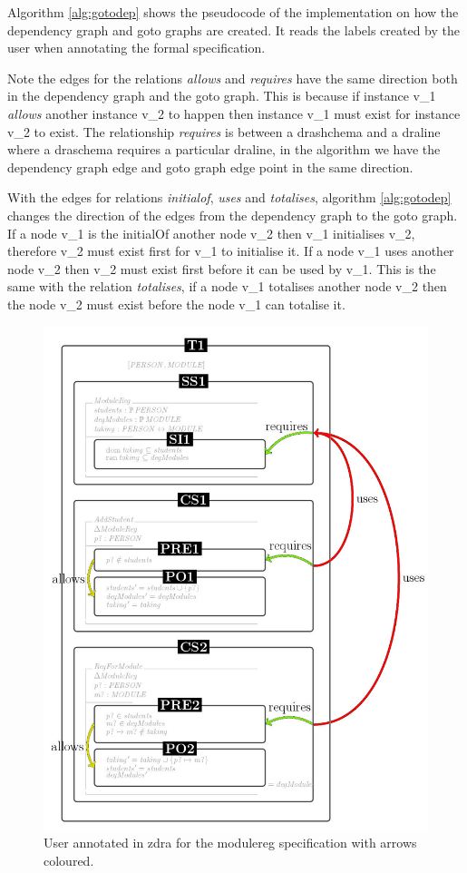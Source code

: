 Algorithm \ref{alg:gotodep} shows the pseudocode of the implementation on how the dependency graph and goto graphs are created. It reads the labels created by the user when annotating the formal specification. 

Note the edges for the relations \emph{allows} and \emph{requires} have the same direction both in the dependency graph and the goto graph. This is because if instance v\_1 \emph{allows} another instance v\_2 to happen then instance v\_1 must exist for instance v\_2 to exist. The relationship \emph{requires} is between a drashchema and a draline where a draschema requires a particular draline, in the algorithm we have the dependency graph edge and goto graph edge point in the same direction.

With the edges for relations \emph{initialof}, \emph{uses} and \emph{totalises}, algorithm \ref{alg:gotodep} changes the direction of the edges from the dependency graph to the goto graph. If a node v\_1 is the initialOf another node v\_2 then v\_1 initialises v\_2, therefore v\_2 must exist first for v\_1 to initialise it. If a node v\_1 uses another node v\_2 then v\_2 must exist first before it can be used by v\_1. This is the same with the relation \emph{totalises}, if a node v\_1 totalises another node v\_2 then the node v\_2 must exist before the node v\_1 can totalise it.

\begin{figure}[H]
\centering
\includegraphics[scale=0.55]{Figures/Formalising/dramodule.png}
\caption{User annotated in \gls{zdra} for the modulereg specification with arrows coloured. \label{fig:zdramodule}}
\end{figure}

